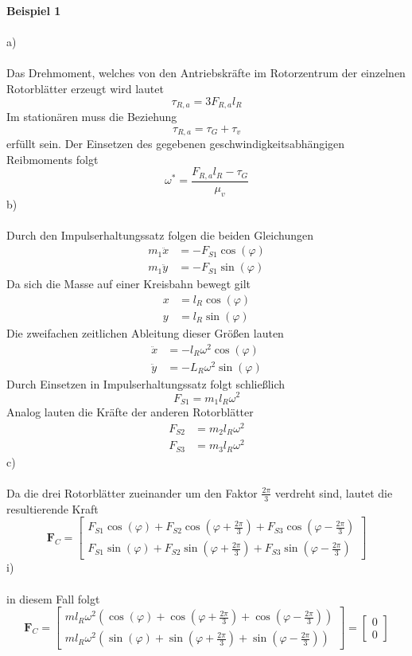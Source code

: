 \textbf{Beispiel 1}\\ \\
a)\\ \\
Das Drehmoment, welches von den Antriebskräfte im Rotorzentrum der einzelnen Rotorblätter erzeugt wird lautet
\[
	\tau_{R,a} = 3F_{R,a}l_R
\]
Im stationären muss die Beziehung
\[
	\tau_{R,a} = \tau_G + \tau_v
\]
erfüllt sein. Der Einsetzen des gegebenen geschwindigkeitsabhängigen Reibmoments folgt
\[
	\omega^* = \frac{F_{R,a}l_R - \tau_G}{\mu_v}
\]
b)\\ \\
Durch den Impulserhaltungssatz folgen die beiden Gleichungen
\begin{align*}
	m_1\ddot{x} &= -F_{S1}\cos(\varphi) \\
	m_1\ddot{y} &= -F_{S1}\sin(\varphi)
\end{align*}
Da sich die Masse auf einer Kreisbahn bewegt gilt
\begin{align*}
	x &= l_R\cos(\varphi) \\
	y &= l_R\sin(\varphi)
\end{align*}
Die zweifachen zeitlichen Ableitung dieser Größen lauten
\begin{align*}
	\ddot{x} &= -l_R\omega^2\cos(\varphi) \\
	\ddot{y} &= -L_R\omega^2\sin(\varphi)
\end{align*}
Durch Einsetzen in Impulserhaltungssatz folgt schließlich
\[
	F_{S1} = m_1l_R\omega^2
\]
Analog lauten die Kräfte der anderen Rotorblätter
\begin{align*}
	F_{S2} &= m_2l_R\omega^2 \\
	F_{S3} &= m_3l_R\omega^2
\end{align*}
c)\\ \\
Da die drei Rotorblätter zueinander um den Faktor $\frac{2\pi}{3}$ verdreht sind, lautet die resultierende Kraft
\[
	\textbf{F}_C = \begin{bmatrix}
		F_{S1}\cos(\varphi) + F_{S2}\cos(\varphi + \frac{2\pi}{3}) + F_{S3}\cos(\varphi - \frac{2\pi}{3}) \\
		F_{S1}\sin(\varphi) + F_{S2}\sin(\varphi + \frac{2\pi}{3}) + F_{S3}\sin(\varphi - \frac{2\pi}{3})
	\end{bmatrix}
\]
\newpage
\noindent
i)\\ \\
in diesem Fall folgt 
\[
\textbf{F}_C = \begin{bmatrix}
	ml_R\omega^2\left(\cos(\varphi) + \cos(\varphi + \frac{2\pi}{3}) + \cos(\varphi - \frac{2\pi}{3})\right) \\
	ml_R\omega^2\left(\sin(\varphi) + \sin(\varphi + \frac{2\pi}{3}) + \sin(\varphi - \frac{2\pi}{3})\right)
\end{bmatrix}
= 
\begin{bmatrix}
	0 \\
	0
\end{bmatrix}
\]
